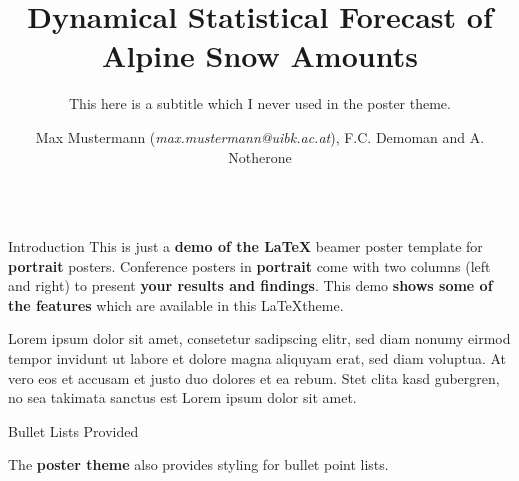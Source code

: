 \documentclass[final]{beamer}
\title{Dynamical Statistical Forecast of Alpine Snow Amounts}
\subtitle{This here is a subtitle which I never used in the poster theme.}
\author{Max Mustermann (\textit{max.mustermann@uibk.ac.at}),
   F.C. Demoman and A. Notherone}
\begin{document}
\begin{frame}[fragile]
\begin{columns}[t]


\begin{leftcolumn}

   \begin{boxblock}{Introduction}
      This is just a {\bf demo of the \LaTeX} beamer
      poster template for {\bf portrait} posters.
      Conference posters in {\bf portrait} come
      with two columns (left and right) to present
      {\bf your results and findings}.
      This demo {\bf shows some of the features} which
      are available in this \LaTeX theme.

      \vspace{1em}
      Lorem ipsum dolor sit amet, consetetur sadipscing elitr, sed diam nonumy
      eirmod tempor invidunt ut labore et dolore magna aliquyam erat, sed diam
      voluptua. At vero eos et accusam et justo duo dolores et ea rebum. Stet clita
      kasd gubergren, no sea takimata sanctus est Lorem ipsum dolor sit amet.
   \end{boxblock}

   \begin{boxblock}{Bullet Lists Provided}

      The {\bf poster theme} also provides styling for bullet
      point lists.


\end{boxblock}
\end{leftcolumn}
\end{columns}
\end{frame}
\end{document}
